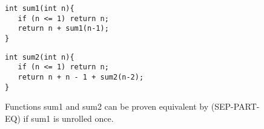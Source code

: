 \begin{figure}[h]
\begin{center}
\begin{minipage}{7 cm}
\begin{lstlisting}
int sum1(int n){
   if (n <= 1) return n;
   return n + sum1(n-1);
}
\end{lstlisting}
\end{minipage}
\begin{minipage}{7 cm}
\begin{lstlisting}
int sum2(int n){
   if (n <= 1) return n;
   return n + n - 1 + sum2(n-2);
}
\end{lstlisting}
\end{minipage}
\caption{Functions sum1 and sum2 can be proven equivalent by (SEP-PART-EQ) if sum1 is unrolled once.}
\label{fig:sum}
\end{center}
\end{figure}

